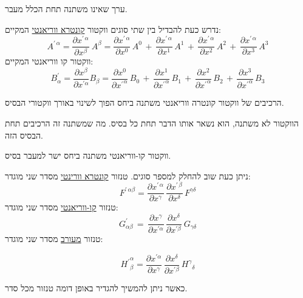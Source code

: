 \documentclass{tstextbook}
\begin{document}
\begin{definition}
ערך שאינו משתנה תחת הכלל מעבר.

\end{definition}
\begin{definition}
נדרש כעת להבדיל בין שתי סוגים ווקטור \underline{קונטרא ווריאנטי} המקיים:
$$A^{\prime\,\alpha}=\frac{\partial x^{\prime\,\alpha}}{\partial x^{\beta}}\:A^{\beta}={\frac{\partial x^{\prime\,\alpha}}{\partial x^{0}}}\,A^{0}\,+\,{\frac{\partial x^{\prime\,\alpha}}{\partial x^{1}}}\,A^{1}\,+\,{\frac{\partial x^{\prime\,\alpha}}{\partial x^{2}}}\,A^{2}\,+\,{\frac{\partial x^{\prime\,\alpha}}{\partial x^{3}}}\,A^{3}$$
ווקטור קו ווריאנטי המקיים:
$$B_{\alpha}^{\prime}=\frac{\partial x^{\beta}}{\partial x^{\prime\alpha}}B_{\beta}=\frac{\partial x^{0}}{\partial{x^{\prime}}^{\alpha}}\,B_{0}\,+\,\frac{\partial x^{1}}{\partial{x^{\prime}}^{\alpha}}\,B_{1}\,+\,\frac{\partial{x}^{2}}{\partial{x^{\prime}}^{\alpha}}\,B_{2}\,+\,\frac{\partial{x}^{3}}{\partial{x^{\prime}}^{\alpha}}\,B_{3}$$

\end{definition}
\begin{proposition}
הרכיבים של ווקטור קונטרה ווריאנטי משתנה ביחס הפוך לשינוי באורך ווקטורי הבסיס.

\end{proposition}
\begin{remark}
הווקטור לא משתנה, הוא נשאר אותו הדבר תחת כל בסיס. מה שמשתנה זה הרכיבים תחת הבסיס הזה.

\end{remark}
\begin{proposition}
ווקטור קו-ווריאנטי משתנה ביחס ישר למעבר בסיס. 

\end{proposition}
\begin{definition}
ניתן כעת שוב להחלק למספר סוגים. טנזור \underline{קונטרא וורינטי} מסדר שני מוגדר:
$$F^{\prime\,\alpha\beta}=\frac{\partial x^{\prime\,\alpha}}{\partial x^{\gamma}}\,\frac{\partial x^{\prime\,\beta}}{\partial x^{\delta}}\,F^{\gamma\delta}$$
טנזור \underline{קו-ווריאנטי} מסדר שני מוגדר:
$$G_{\alpha\beta}^{\prime}\,=\,{\frac{\partial x^{\gamma}}{\partial x^{\prime\alpha}}}\,{\frac{\partial x^{\delta}}{\partial x^{\prime\beta}}}\ G_{\gamma\delta}$$
טנזור \underline{מעורב} מסדר שני מוגדר:

$${H^{\prime}}_{\beta}^{\alpha}=\frac{\partial x^{\prime\alpha}}{\partial x^{\gamma}}\,\frac{\partial x^{\delta}}{\partial x^{\prime\beta}}\,{H^{\gamma}}_{\delta}$$

\end{definition}
כאשר ניתן להמשיך להגדיר באופן דומה טנזור מכל סדר.
\end{document}
